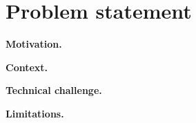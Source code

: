 
\section{Problem statement}

\textbf{Motivation.}


\textbf{Context.}

\textbf{Technical challenge.}

\textbf{Limitations.}

\nocite{Haykin:Communication_Systems}


